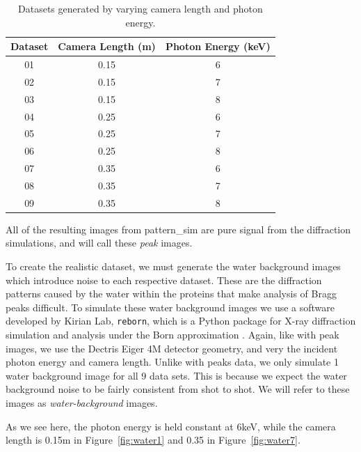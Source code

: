 \documentclass[12pt]{article}
\begin{document}
\begin{table}[H]
\centering
\caption{Datasets generated by varying camera length and photon energy.}
\label{tab:dataset-parameters}
\begin{tabular}{c|c|c}
Dataset & Camera Length (m) & Photon Energy (keV) \\
\hline
01 & 0.15 & 6 \\
02 & 0.15 & 7 \\
03 & 0.15 & 8 \\
04 & 0.25 & 6 \\
05 & 0.25 & 7 \\
06 & 0.25 & 8 \\
07 & 0.35 & 6 \\
08 & 0.35 & 7 \\
09 & 0.35 & 8 \\
\end{tabular}
\end{table}

All of the resulting images from pattern\_sim are pure signal from the diffraction simulations, and will call these \textit{peak} images.

To create the realistic dataset, we must generate the water background images which introduce noise to each respective dataset. These are the diffraction patterns caused by the water within the proteins that make analysis of Bragg peaks difficult. To simulate these water background images we use a software developed by Kirian Lab, \texttt{reborn}, which is a Python package for X-ray diffraction simulation and analysis under the Born approximation \cite{reborn}. Again, like with peak images, we use the Dectris Eiger 4M detector geometry, and very the incident photon energy and camera length. Unlike with peaks data, we only simulate 1 water background image for all 9 data sets. This is because we expect the water background noise to be fairly consistent from shot to shot. We will refer to these images as \textit{water-background} images.

As we see here, the photon energy is held constant at 6keV, while the camera length is 0.15m in Figure~\ref{fig:water1} and 0.35 in Figure~\ref{fig:water7}.
\end{document}
